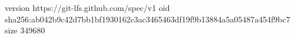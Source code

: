 version https://git-lfs.github.com/spec/v1
oid sha256:ab042b9c42d7bb1bf1930162c3ac3465463df19f9b13884a5a05487a454f9bc7
size 349680
